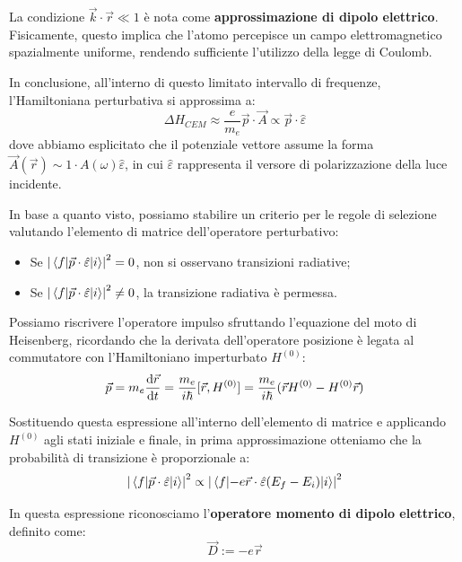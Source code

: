 La condizione \( \vec{k}\cdot\vec{r} \ll 1 \) è nota come \textbf{approssimazione di dipolo elettrico}. Fisicamente, questo implica che l'atomo percepisce un campo elettromagnetico spazialmente uniforme, rendendo sufficiente l'utilizzo della legge di Coulomb.

In conclusione, all'interno di questo limitato intervallo di frequenze, l'Hamiltoniana perturbativa si approssima a:
\begin{equation}
    \Delta H_{CEM} \approx \frac{e}{m_e} \vec{p} \cdot \vec{A} \propto \vec{p} \cdot \hat{\varepsilon}
\end{equation}
dove abbiamo esplicitato che il potenziale vettore assume la forma \( \vec{A}(\vec{r}) \sim 1 \cdot A(\omega)\hat{\varepsilon} \), in cui \( \hat{\varepsilon} \) rappresenta il versore di polarizzazione della luce incidente.

In base a quanto visto, possiamo stabilire un criterio per le regole di selezione valutando l'elemento di matrice dell'operatore perturbativo:
\begin{itemize}
    \item Se \( \abs{\mel{f}{\vec{p} \cdot \hat{\varepsilon}}{i}}^2 = 0 \), non si osservano transizioni radiative;
    \item Se \( \abs{\mel{f}{\vec{p} \cdot \hat{\varepsilon}}{i}}^2 \neq 0 \), la transizione radiativa è permessa.
\end{itemize}

Possiamo riscrivere l'operatore impulso sfruttando l'equazione del moto di Heisenberg, ricordando che la derivata dell'operatore posizione è legata al commutatore con l'Hamiltoniano imperturbato \( H^{(0)} \):
\begin{equation}
    \vec{p} = m_e \dv{\vec{r}}{t} = \frac{m_e}{i\hbar} [\vec{r}, H^{(0)}] = \frac{m_e}{i\hbar} (\vec{r} H^{(0)} - H^{(0)} \vec{r})
\end{equation}

Sostituendo questa espressione all'interno dell'elemento di matrice e applicando \( H^{(0)} \) agli stati iniziale e finale, in prima approssimazione otteniamo che la probabilità di transizione è proporzionale a:
\begin{equation}
    \abs{\mel{f}{\vec{p} \cdot \hat{\varepsilon}}{i}}^2 \propto \abs{\mel{f}{-e\vec{r} \cdot \hat{\varepsilon} (E_f - E_i)}{i}}^2
\end{equation}

In questa espressione riconosciamo l'\textbf{operatore momento di dipolo elettrico}, definito come:
\begin{equation}
    \vec{D} := -e \vec{r}
\end{equation}

